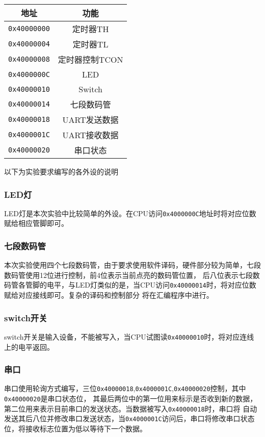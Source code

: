 \documentclass{ctexart}
\begin{document}
		\begin{table}[ht]
			\centering
			\begin{tabular}{|c|c|}
				\hline
				地址 & 功能  \\
				\hline
				\verb"0x40000000" & 定时器TH \\
				\verb"0x40000004" & 定时器TL \\
				\verb"0x40000008" & 定时器控制TCON \\
				\verb"0x4000000C" & LED \\
				\verb"0x40000010" & Switch \\
				\verb"0x40000014" & 七段数码管 \\
				\verb"0x40000018" & UART发送数据 \\
				\verb"0x4000001C" & UART接收数据 \\
				\verb"0x40000020" & 串口状态 \\ 
				\hline
			\end{tabular}
		\end{table}


以下为实验要求编写的各外设的说明

			\subsubsection{LED灯}
			LED灯是本次实验中比较简单的外设。在CPU访问\verb"0x4000000C"地址时将对应位数赋给相应管脚即可。
			\subsubsection{七段数码管}
			本次实验使用四个七段数码管，由于要求使用软件译码，硬件部分较为简单，七段数码管使用12位进行控制，前4位表示当前点亮的数码管位置，
			后八位表示七段数码管各管脚的电平，与LED灯类似的是，当CPU访问\verb"0x40000014"时，将对应位数赋给对应接线即可。复杂的译码和控制部分
			将在汇编程序中进行。
			\subsubsection{switch开关}
			switch开关是输入设备，不能被写入，当CPU试图读\verb"0x40000010"时，将对应连线上的电平返回。
			\subsubsection{串口}
			
			串口使用轮询方式编写，三位\verb"0x40000018",\verb"0x4000001C",\verb"0x40000020"控制，其中\verb"0x40000020"是串口状态位，
			其最后两位中的第一位用来标示是否收到新的数据，第二位用来表示目前串口的发送状态。当数据被写入\verb"0x40000018"时，串口将
			自动发送其后八位并修改串口发送状态，当\verb"0x4000001C"访问后，串口将修改串口状态位，将接收标志位置为低以等待下一个数据。
\end{document}
